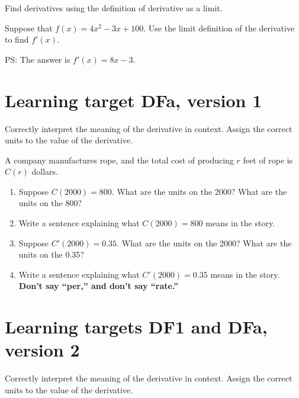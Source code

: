 Find derivatives using the definition of derivative as a limit.

\hrulefill

Suppose that  \(f(x)=4x^2-3x+100\). Use the limit definition of the derivative to find $f'(x)$.

\vfill

PS: The answer is $f'(x) = 8x - 3.$


\pagebreak


\section{Learning target DFa, version 1}

Correctly interpret the meaning of the derivative in context. Assign the correct units to the value of the derivative.

\hrulefill

A company manufactures rope, and the total cost of producing $r$ feet of rope is $C(r)$ dollars.
\begin{enumerate}[leftmargin=0pt]
    \item Suppose $C(2000) = 800$. What are the units on the 2000? What are the units on the 800?
    \vfill
    \item Write a sentence explaining what $C(2000) = 800$ means in the story.
    \vfill
    \item Suppose $C'(2000) = 0.35$. What are the units on the 2000? What are the units on the 0.35?
    \vfill
    \item Write a sentence explaining what $C'(2000) = 0.35$ means in the story. \\
    \textbf{Don't say ``per,'' and don't say ``rate.''}
    \vfill
\end{enumerate}


\pagebreak

\section{Learning targets DF1 and DFa, version 2}

Correctly interpret the meaning of the derivative in context. Assign the correct units to the value of the derivative.

\hrulefill

